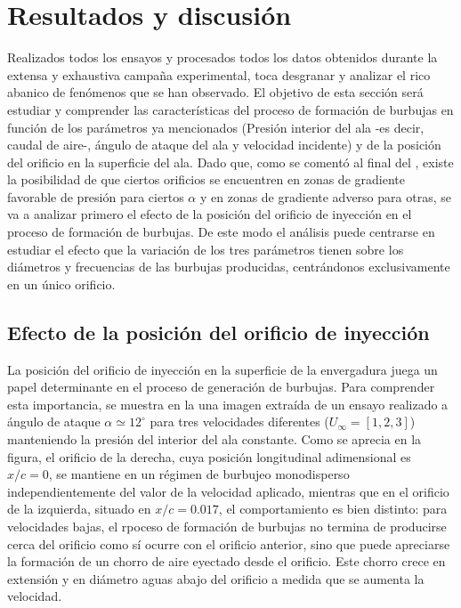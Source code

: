 \section{Resultados y discusión}

Realizados todos los ensayos y procesados todos los datos obtenidos durante la extensa y exhaustiva campaña experimental, toca desgranar y analizar el rico abanico de fenómenos que se han observado. El objetivo de esta sección será estudiar y comprender las características del proceso de formación de burbujas en función de los parámetros ya mencionados (Presión interior del ala -es decir, caudal de aire-, ángulo de ataque del ala y velocidad incidente) y de la posición del orificio en la superficie del ala. Dado que, como se comentó al final del , existe la posibilidad de que ciertos orificios se encuentren en zonas de gradiente favorable de presión para ciertos $\alpha$ y en zonas de gradiente adverso para otras, se va a analizar primero el efecto de la posición del orificio de inyección en el proceso de formación de burbujas. De este modo el análisis puede centrarse en estudiar el efecto que la variación de los tres parámetros tienen sobre los diámetros y frecuencias de las burbujas producidas, centrándonos exclusivamente en un único orificio. 

\subsection{Efecto de la posición del orificio de inyección}

La posición del orificio de inyección en la superficie de la envergadura juega un papel determinante en el proceso de generación de burbujas. Para comprender esta importancia, se muestra en la  una imagen extraída de un ensayo realizado a ángulo  de ataque $\alpha \simeq 12^{\circ}$ para tres velocidades diferentes ($U_{\infty} = \left[1,2,3\right]$) manteniendo la presión del interior del ala constante. Como se aprecia en la figura, el orificio de la derecha, cuya posición longitudinal adimensional es $x/c = 0$, se mantiene en un régimen de burbujeo monodisperso independientemente del valor de la velocidad aplicado, mientras que en el orificio de la izquierda, situado en $x/c = 0.017$, el comportamiento es bien distinto: para velocidades bajas, el rpoceso de formación de burbujas no termina de producirse cerca del orificio como sí ocurre con el orificio anterior, sino que puede apreciarse la formación de un chorro de aire eyectado desde el orificio. Este chorro crece en extensión y en diámetro aguas abajo del orificio a medida que se aumenta la velocidad.

